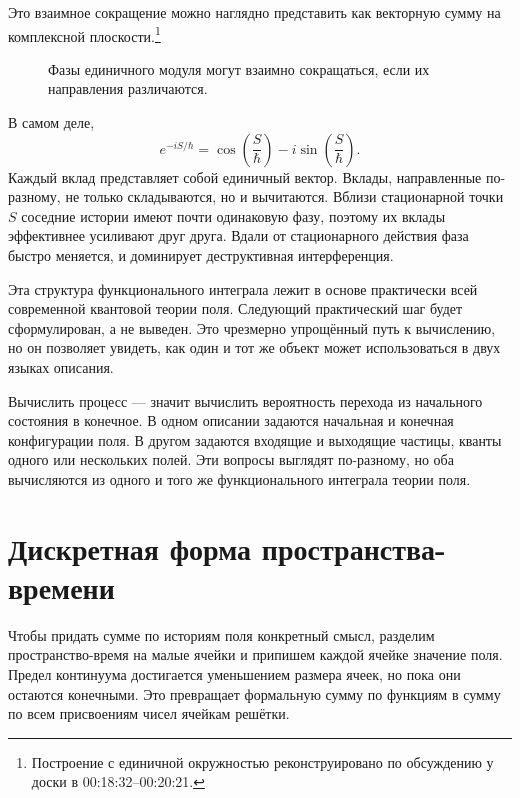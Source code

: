 Это взаимное сокращение можно наглядно представить как векторную сумму на комплексной плоскости.\footnote{Построение с единичной окружностью реконструировано по обсуждению у доски в 00:18:32--00:20:21.}
\begin{figure}[htbp]
\centering
{}
\caption{Фазы единичного модуля могут взаимно сокращаться, если их направления различаются.}
\end{figure}

В самом деле,
\begin{equation}
e^{-iS/\hbar}
=
\cos\!\left(\frac{S}{\hbar}\right)
-i\sin\!\left(\frac{S}{\hbar}\right).
\end{equation}
Каждый вклад представляет собой единичный вектор. Вклады, направленные по-разному, не только складываются, но и вычитаются. Вблизи стационарной точки \(S\) соседние истории имеют почти одинаковую фазу, поэтому их вклады эффективнее усиливают друг друга. Вдали от стационарного действия фаза быстро меняется, и доминирует деструктивная интерференция.

Эта структура функционального интеграла лежит в основе практически всей современной квантовой теории поля. Следующий практический шаг будет сформулирован, а не выведен. Это чрезмерно упрощённый путь к вычислению, но он позволяет увидеть, как один и тот же объект может использоваться в двух языках описания.

Вычислить процесс — значит вычислить вероятность перехода из начального состояния в конечное. В одном описании задаются начальная и конечная конфигурации поля. В другом задаются входящие и выходящие частицы, кванты одного или нескольких полей. Эти вопросы выглядят по-разному, но оба вычисляются из одного и того же функционального интеграла теории поля.

\section{Дискретная форма пространства-времени}

Чтобы придать сумме по историям поля конкретный смысл, разделим пространство-время на малые ячейки и припишем каждой ячейке значение поля. Предел континуума достигается уменьшением размера ячеек, но пока они остаются конечными. Это превращает формальную сумму по функциям в сумму по всем присвоениям чисел ячейкам решётки.

